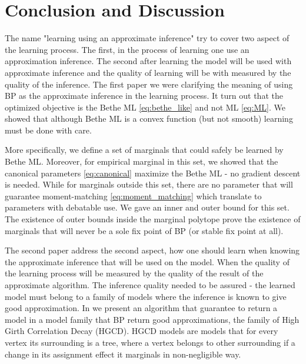 \chapter{Conclusion and Discussion } %
\label{con} %
The name "learning using an approximate inference"  try to cover two aspect of the learning process.
The first, in the process of learning one use an approximation inference.
The second after learning the model will be used with approximate inference and the quality of learning will be with measured by the quality of the inference.
The first paper  we were clarifying the meaning of using BP as the approximate inference in the learning process.
It turn out that the optimized objective is the Bethe ML \eqref{eq:bethe_like} and not ML \eqref{eq:ML}.
We showed that although Bethe ML is a convex function (but not smooth) learning must be done with care.

More specifically, we define a set of marginals that could safely be learned by Bethe ML.
Moreover, for empirical marginal in this set, we showed that the canonical parameters \eqref{eq:canonical}  maximize the Bethe ML - no gradient descent is needed.
While for marginals outside this set, there are no parameter that will guarantee moment-matching \eqref{eq:moment_matching}  which translate to parameters with debatable use.
We gave an inner and outer bound for this set.
The existence of outer bounds inside the marginal polytope prove the existence of marginals that will never be a sole fix point of BP (or stable fix point at all).

The second paper address the second aspect, how one should learn when knowing the approximate inference that will be used on the model.
When the quality of the learning process will be measured by the quality of the result of the approximate algorithm. 
The inference quality needed to be assured  - the learned  model must belong to a family of models where the inference is known to give good approximation.
In  we present an algorithm that guarantee to return a model in a model family that BP return good approximations, the family of High Girth Correlation Decay (HGCD).
HGCD models are models that for every vertex its surrounding is a tree, where a vertex belongs to other surrounding if a change in its assignment effect it marginals in non-negligible way.

